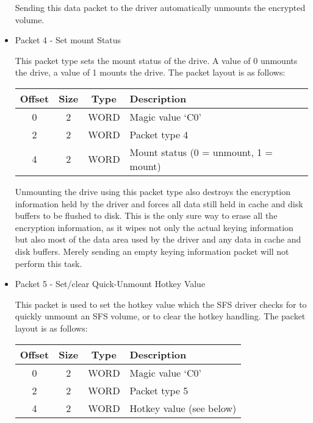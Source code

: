 \begin{itemize}
Sending this data packet to the driver automatically unmounts the encrypted
volume.


\item Packet 4 - Set mount Status

This packet type sets the mount status of the drive.  A value of 0 unmounts the
drive, a value of 1 mounts the drive.  The packet layout is as follows:

\begin{center}
\begin{tabular}{|c|c|c|l|}
\hline
    Offset & Size  &  Type   &     Description\\
\hline
       0   &   2   &  WORD   &     Magic value `C0'\\
       2   &   2   &  WORD   &     Packet type 4\\
       4   &   2   &  WORD   &     Mount status (0 = unmount, 1 = mount)\\
\hline
\end{tabular}
\end{center}

Unmounting the drive using this packet type also destroys the encryption
information held by the driver and forces all data still held in cache and disk
buffers to be flushed to disk.  This is the only sure way to erase all the
encryption information, as it wipes not only the actual keying information but
also most of the data area used by the driver and any data in cache and disk
buffers.  Merely sending an empty keying information packet will not perform
this task.


\item Packet 5 - Set/clear Quick-Unmount Hotkey Value

This packet is used to set the hotkey value which the SFS driver checks for to
quickly unmount an SFS volume, or to clear the hotkey handling.  The packet
layout is as follows:

\begin{center}
\begin{tabular}{|c|c|c|l|}
\hline
    Offset & Size  &  Type   &     Description\\
\hline
       0   &   2   &  WORD   &     Magic value `C0'\\
       2   &   2   &  WORD   &     Packet type 5\\
       4   &   2   &  WORD   &     Hotkey value (see below)\\
\hline
\end{tabular}
\end{center}


\end{itemize}
